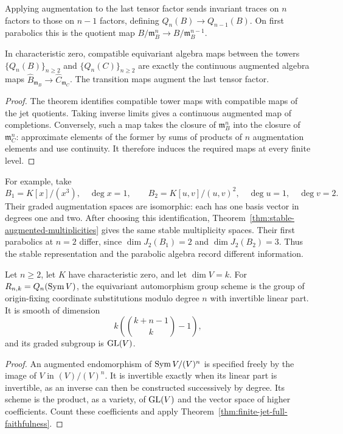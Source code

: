 Applying augmentation to the last tensor factor sends invariant traces
on $n$ factors to those on $n-1$ factors, defining $Q_n(B)\to Q_{n-1}(B)$.
On first parabolics this is the quotient map
$B/\mathfrak m_B^n\to B/\mathfrak m_B^{n-1}$.

\begin{corollary}
\label{cor:formal-towers}
In characteristic zero, compatible equivariant algebra maps between
the towers $\{Q_n(B)\}_{n\ge2}$ and $\{Q_n(C)\}_{n\ge2}$ are
exactly the continuous augmented algebra maps
$\widehat B_{\mathfrak m_B}\to\widehat C_{\mathfrak m_C}$.
The transition maps augment the last tensor factor.
\end{corollary}

\begin{proof}
The theorem identifies compatible tower maps with compatible maps
of the jet quotients.  Taking inverse limits gives a continuous augmented
map of completions.  Conversely, such a map takes the closure of
$\mathfrak m_B^n$ into the closure of $\mathfrak m_C^n$: approximate
elements of the former by sums of products of $n$ augmentation
elements and use continuity.  It therefore induces the required
maps at every finite level.
\end{proof}

For example, take
\[
 B_1=K[x]/(x^3),\quad \deg x=1,
 \qquad
 B_2=K[u,v]/(u,v)^2,\quad \deg u=1,\quad\deg v=2.
\]
Their graded augmentation spaces are isomorphic: each has one
basis vector in degrees one and two.  After choosing this
identification, Theorem~\ref{thm:stable-augmented-multiplicities}
gives the same stable multiplicity spaces.  Their first parabolics
at $n=2$ differ, since $\dim J_2(B_1)=2$ and
$\dim J_2(B_2)=3$.  Thus the stable representation and the
parabolic algebra record different information.

\begin{corollary}
\label{cor:polynomial-jet-automorphisms}
Let $n\ge2$, let $K$ have characteristic zero, and let $\dim V=k$.
For $R_{n,k}=Q_n(\operatorname{Sym} V)$, the equivariant
automorphism group scheme is the group of origin-fixing coordinate
substitutions modulo degree $n$ with invertible linear part.  It is
smooth of dimension
\[
                 k\left(\binom{k+n-1}{k}-1\right),
\]
and its graded subgroup is $\operatorname{GL}(V)$.
\end{corollary}

\begin{proof}
An augmented endomorphism of $\operatorname{Sym} V/(V)^n$ is specified freely
by the image of $V$ in $(V)/(V)^n$.  It is invertible exactly
when its linear part is invertible, as an inverse can then be
constructed successively by degree.  Its scheme is the product,
as a variety, of $\operatorname{GL}(V)$ and the vector space of higher
coefficients.  Count these coefficients and apply
Theorem~\ref{thm:finite-jet-full-faithfulness}.
\end{proof}
